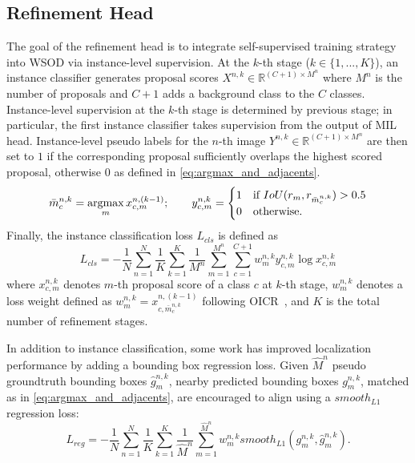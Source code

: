 \documentclass[runningheads]{llncs}
\newcommand{\argmax}{\operatornamewithlimits{argmax}}
\begin{document}
\subsection{Refinement Head}
\label{sec:REF}
The goal of the refinement head is to integrate self-supervised training strategy into WSOD via instance-level supervision. 
At the $k$-th stage ($k \in \{1, ..., K\}$), an instance classifier generates proposal scores $X^{n,k} \in\mathbb{R}^{(C+1) \times M^n}$ where $M^n$ is the number of proposals and $C+1$ adds a background class to the $C$ classes.
Instance-level supervision at the $k$-th stage is determined by previous stage; in particular, the first instance classifier takes supervision from the output of MIL head.
Instance-level pseudo labels for the $n$-th image $Y^{n,k} \in\mathbb{R}^{(C+1) \times M^n}$ are then set to $1$ if the corresponding proposal sufficiently overlaps the highest scored proposal, otherwise $0$ as defined in \eqref{eq:argmax_and_adjacents}.
\begin{equation}
    \bar{m}^{n,k}_c = \argmax_m  {x^{n,(k-1)}_{c,m}};
    \qquad
    y^{n,k}_{c,m} =
      \begin{cases}
        1  & \text{if $IoU(r_m, r_{\bar{m}^{n,k}_c}) > 0.5$}\\
        0  & \text{otherwise.}
      \end{cases}\label{eq:argmax_and_adjacents}
\end{equation}
Finally, the instance classification loss $L_{cls}$ is defined as
\begin{equation}
L_{cls} = -\frac{1}{N}\sum_{n=1}^{N}\frac{1}{K}\sum_{k=1}^{K}\frac{1}{M^n}\sum_{m=1}^{M^n}\sum_{c=1}^{C+1} w^{n,k}_m y^{n,k}_{c,m}\log{x^{n,k}_{c,m}}
\label{eq:b_cls_loss}
\end{equation}
where $x^{n,k}_{c,m}$ denotes $m$-{th} proposal score of a class $c$ at $k$-th stage, $w^{n,k}_m$ denotes a loss weight defined as $w^{n,k}_m = x^{n,(k-1)}_{c,\bar{m}^{n,k}_c}$ following OICR~\cite{Tang_2017_CVPR}, and $K$ is the total number of refinement stages.
  
In addition to instance classification, some work \cite{zeng2019wsod2,Yang_2019_ICCV} has improved localization performance by adding a bounding box regression loss.
Given $\hat M^n$ pseudo groundtruth bounding boxes $\hat g^{n,k}_m$,
nearby predicted bounding boxes $g^{n,k}_m$, matched as in \eqref{eq:argmax_and_adjacents},
are encouraged to align using a $smooth_{L1}$ regression loss:
\begin{equation}
L_{reg} = -\frac{1}{N}\sum_{n=1}^{N}\frac{1}{K}\sum_{k=1}^{K}\frac{1}{\hat{M}^n}\sum_{m=1}^{\hat{M}^n} w^{n,k}_m smooth_{L1}(g^{n,k}_m, \hat{g}^{n,k}_m)
\label{eq:b_reg_loss}
.\end{equation}
\end{document}
